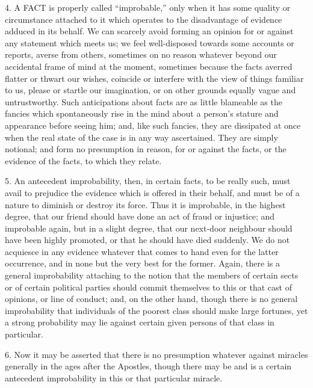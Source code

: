 
4.
A FACT is properly called ``improbable,'' only when it has some quality or circumstance
attached to it which operates to the disadvantage of evidence adduced
in its behalf. We can scarcely avoid forming an opinion for or against
any statement which meets us; we feel well-disposed towards some
accounts or reports, averse from others, sometimes on no reason
whatever beyond our accidental frame of mind at the moment, sometimes
because the facts averred flatter or thwart our wishes, coincide or
interfere with the view of things familiar to us, please or startle
our imagination, or on other grounds equally vague and untrustworthy.
Such anticipations about facts are as little blameable as the fancies
which spontaneously rise in the mind about a person's stature and
appearance before seeing him; and, like such fancies, they are
dissipated at once when the real state of the case is in any way
ascertained. They are simply notional; and form no presumption
in reason, for or against the facts, or the evidence of the facts, to
which they relate.

5.
An antecedent improbability, then, in certain facts, to be really
such, must avail to prejudice the evidence which is offered in their
behalf, and must be of a nature to diminish or destroy its force. Thus
it is improbable, in the highest degree, that our friend should have
done an act of fraud or injustice; and improbable again, but in a
slight degree, that our next-door neighbour should have been highly
promoted, or that he should have died suddenly. We do not acquiesce in
any evidence whatever that comes to hand even for the latter
occurrence, and in none but the very best for the former. Again, there
is a general improbability attaching to the notion that the members of
certain sects or of certain political parties should commit themselves
to this or that cast of opinions, or line of conduct; and, on the
other hand, though there is no general improbability that individuals
of the poorest class should make large fortunes, yet a strong
probability may lie against certain given persons of that class in
particular.

6.
Now it may be asserted that there is no presumption whatever against
miracles generally in the ages after the Apostles, though there may be
and is a certain antecedent improbability in this or that particular
miracle.

